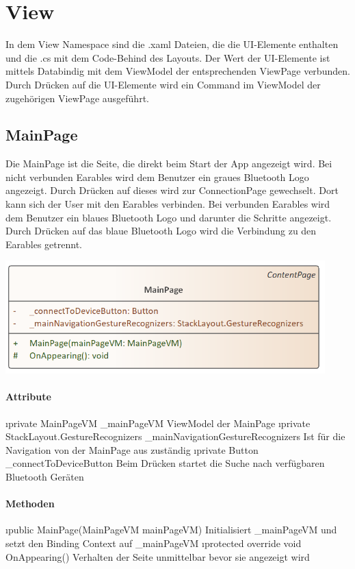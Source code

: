 \documentclass[../entwurf.tex]{subfiles}
\begin{document}
\section{View}
In dem View Namespace sind die .xaml Dateien, die die UI-Elemente enthalten und die .cs mit dem Code-Behind des Layouts. Der Wert der UI-Elemente ist mittels Databindig mit dem ViewModel der entsprechenden ViewPage verbunden. Durch Drücken auf die UI-Elemente wird ein Command im ViewModel der zugehörigen ViewPage ausgeführt. 
\subsection{MainPage}
Die MainPage ist die Seite, die direkt beim Start der App angezeigt wird. Bei nicht verbunden Earables wird dem Benutzer ein graues Bluetooth Logo angezeigt. Durch Drücken auf dieses wird zur ConnectionPage gewechselt. Dort kann sich der User mit den Earables verbinden. Bei verbunden Earables wird dem Benutzer ein blaues Bluetooth Logo und darunter die Schritte angezeigt. Durch Drücken auf das blaue Bluetooth Logo wird die Verbindung zu den Earables getrennt. 

\begin{center}
	\includegraphics[page=1,width=350pt,keepaspectratio]{../uml_klassen/View/MainPage.png}
\end{center}

\paragraph{Attribute}

\begin{itemize}
	\i{private MainPageVM \_mainPageVM} ViewModel der MainPage
	\i{private StackLayout.GestureRecognizers \_mainNavigationGestureRecognizers} Ist für die Navigation von der MainPage aus zuständig
	\i{private Button \_connectToDeviceButton} Beim Drücken startet die Suche nach verfügbaren Bluetooth Geräten
\end{itemize}
\paragraph{Methoden}
\begin{itemize}
	\i{public MainPage(MainPageVM mainPageVM)} Initialisiert \_mainPageVM und setzt den Binding Context 			auf \_mainPageVM
	\i{protected override void OnAppearing()} Verhalten der Seite unmittelbar bevor sie angezeigt wird
\end{itemize}
\end{document}
